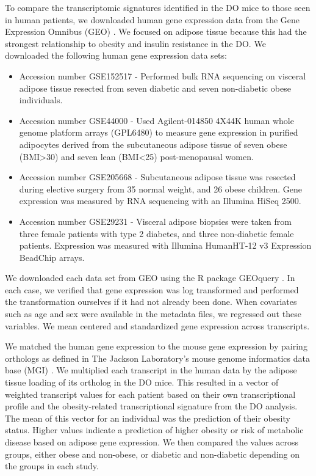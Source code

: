 \documentclass[
]{article}
\begin{document}
To compare the transcriptomic signatures identified in the DO mice to
those seen in human patients, we downloaded human gene expression data
from the Gene Expression Omnibus (GEO)
\cite{pmid37933855, pmid11752295}. We focused on adipose tissue because
this had the strongest relationship to obesity and insulin resistance in
the DO. We downloaded the following human gene expression data sets:

\begin{itemize}
\item
  Accession number GSE152517 - Performed bulk RNA sequencing on visceral
  adipose tissue resected from seven diabetic and seven non-diabetic
  obese individuals.
\item
  Accession number GSE44000 - Used Agilent-014850 4X44K human whole
  genome platform arrays (GPL6480) to measure gene expression in
  purified adipocytes derived from the subcutaneous adipose tissue of
  seven obese (BMI\textgreater30) and seven lean (BMI\textless25)
  post-menopausal women.
\item
  Accession number GSE205668 - Subcutaneous adipose tissue was resected
  during elective surgery from 35 normal weight, and 26 obese children.
  Gene expression was measured by RNA sequencing with an Illumina HiSeq
  2500.
\item
  Accession number GSE29231 - Visceral adipose biopsies were taken from
  three female patients with type 2 diabetes, and three non-diabetic
  female patients. Expression was measured with Illumina HumanHT-12 v3
  Expression BeadChip arrays.
\end{itemize}

We downloaded each data set from GEO using the R package GEOquery
\cite{geoquery}. In each case, we verified that gene expression was log
transformed and performed the transformation ourselves if it had not
already been done. When covariates such as age and sex were available in
the metadata files, we regressed out these variables. We mean centered
and standardized gene expression across transcripts.

We matched the human gene expression to the mouse gene expression by
pairing orthologs as defined in The Jackson Laboratory's mouse genome
informatics data base (MGI) \cite{pmid38531069}. We multiplied each
transcript in the human data by the adipose tissue loading of its
ortholog in the DO mice. This resulted in a vector of weighted
transcript values for each patient based on their own transcriptional
profile and the obesity-related transcriptional signature from the DO
analysis. The mean of this vector for an individual was the prediction
of their obesity status. Higher values indicate a prediction of higher
obesity or risk of metabolic disease based on adipose gene expression.
We then compared the values across groups, either obese and non-obese,
or diabetic and non-diabetic depending on the groups in each study.
\end{document}
